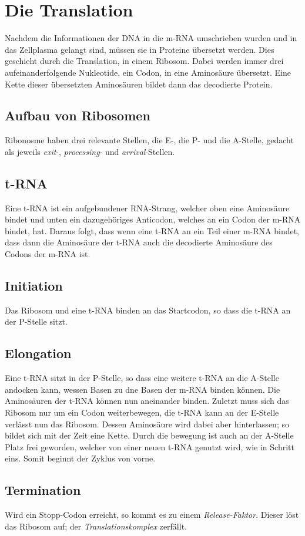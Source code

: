 \documentclass{article}
\begin{document}
\section{Die Translation}
Nachdem die Informationen der DNA in die m-RNA umschrieben wurden und in das Zellplasma gelangt sind, müssen sie in Proteine übersetzt werden. Dies geschieht durch die Translation, in einem Ribosom. Dabei werden immer drei aufeinanderfolgende Nukleotide, ein Codon, in eine Aminosäure übersetzt. Eine Kette dieser übersetzten Aminosäuren bildet dann das decodierte Protein.
 
\subsection{Aufbau von Ribosomen}
Ribonosme haben drei relevante Stellen, die E-, die P- und die A-Stelle, gedacht als jeweils \emph{exit}-, \emph{processing}- und \emph{arrival}-Stellen. 
 
\subsection{t-RNA}
Eine t-RNA ist ein aufgebundener RNA-Strang, welcher oben eine Aminosäure bindet und unten  ein dazugehöriges Anticodon, welches an ein Codon der m-RNA bindet, hat. Daraus folgt, dass wenn eine t-RNA an ein Teil einer m-RNA bindet, dass dann die Aminosäure der t-RNA auch die decodierte Aminosäure des Codons der m-RNA ist. 
 
\subsection{Initiation}
Das Ribosom und eine t-RNA binden an das Startcodon, so dass die t-RNA an der P-Stelle sitzt.

\subsection{Elongation} 
Eine t-RNA sitzt in der P-Stelle, so dass eine weitere t-RNA an die A-Stelle andocken kann, wessen Basen zu dne Basen der m-RNA binden können. Die Aminosäuren der t-RNA können nun aneinander binden. Zuletzt muss sich das Ribosom nur um ein Codon weiterbewegen, die t-RNA kann an der E-Stelle verlässt nun das Ribosom. Dessen Aminosäure wird dabei aber hinterlassen; so bildet sich mit der Zeit eine Kette. Durch die bewegung ist auch an der A-Stelle Platz frei geworden, welcher von einer neuen t-RNA genutzt wird, wie in Schritt eins. Somit beginnt der Zyklus von vorne.

\subsection{Termination}
Wird ein Stopp-Codon erreicht, so kommt es zu einem \emph{Release-Faktor}. Dieser löst das Ribosom auf; der \emph{Translationskomplex} zerfällt.
\end{document}
